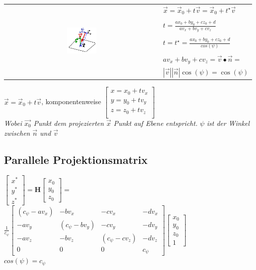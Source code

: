 \begin{tabular}{cl}
    \multirow{8}{*}{
        \includegraphics[width=0.2\textwidth]{assets/parallel-projection.png}
    } & $\vec{x} = \vec{x}_0 + t\vec{v} = \vec{x}_0 + t^\star\vec{v}$ \\
    & \\
    & $t = \frac{ax_0 + by_0 + cz_0 + d}{av_x + bv_y + cv_z}$\\
    & \\
    & $t = t^\star = \frac{ax_0 + by_0 + cz_0 + d}{cos(\psi)}$\\
    & \\
    & $av_x + bv_y + cv_z = \vec{v} \bullet \vec{n} =$\\
    & $|\vec{v}||\vec{n}|\cos(\psi) = \cos(\psi)$ \\
\end{tabular}

$\vec{x} = \vec{x}_0 + t\vec{v}$, komponentenweise $\begin{bmatrix}
    x = x_0 + tv_x \\
    y = y_0 + tv_y \\
    z = z_0 + tv_z \\
\end{bmatrix}$ \\
\textit{Wobei $\vec{x_0}$ Punkt dem projezierten $\vec{x}$ Punkt auf Ebene entspricht.}
\textit{$\psi$ ist der Winkel zwischen $\vec{n}$ und $\vec{v}$}

\subsection{Parallele Projektionsmatrix}

$\begin{bmatrix}
    x^* \\
    y^* \\
    z^*
\end{bmatrix} = \mathbf{H} \begin{bmatrix}
    x_0 \\
    y_0 \\
    z_0
\end{bmatrix} = $ \\
$\frac{1}{c_\psi} \begin{bmatrix}
    (c_\psi - av_x) & -bv_x & -cv_x & -dv_x \\
    -av_y & (c_\psi - bv_y) & -cv_y & -dv_y \\
    -av_z & -bv_z & (c_\psi - cv_z) & -dv_z \\
    0 & 0 & 0 & c_\psi
\end{bmatrix} \begin{bmatrix}
    x_0 \\
    y_0 \\
    z_0 \\
    1
\end{bmatrix}$ \\
\textit{$cos(\psi) = c_\psi$}

